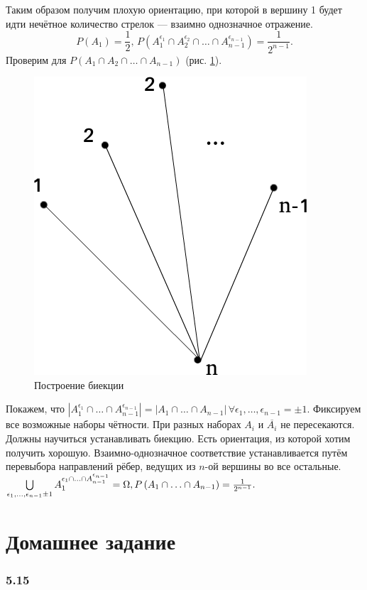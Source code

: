 Таким образом получим плохую ориентацию, при которой в вершину 1 будет идти нечётное количество стрелок --- взаимно однозначное отражение.
$$P \left( A_1 \right) =
\frac{1}{2}, \, P \left( A_1^{ \epsilon_1 } \cap A_2^{ \epsilon_2} \cap \dotsc \cap A_{n-1}^{ \epsilon_{n-1} } \right) =
\frac{1}{2^{n-1}}.$$
Проверим для $P \left( A_1 \cap A_2 \cap \dotsc \cap A_{n-1} \right) $ (рис. \ref{fig:5143}).

\begin{figure}[h!]
  \centering
  \includegraphics[width=.4\textwidth]{./pictures/5_14_3.png}
  \caption{Построение биекции}
  \label{fig:5143}
\end{figure}

Покажем, что
$ \left| A_1^{ \epsilon_1 } \cap \dotsc \cap A_{n-1}^{ \epsilon_{n-1} } \right| =
\left| A_1 \cap \dotsc \cap A_{n-1} \right| \,
\forall \epsilon_1, \dotsc, \epsilon_{n-1} =
\pm 1$.
Фиксируем все возможные наборы чётности.
При разных наборах $A_i$ и $ \overline{A_i} $ не пересекаются.
Должны научиться устанавливать биекцию.
Есть ориентация, из которой хотим получить хорошую.
Взаимно-однозначное соответствие устанавливается путём перевыбора направлений рёбер, ведущих из $n$-ой вершины во все остальные.
$ \bigcup \limits_{ \epsilon_1, \dotsc, \epsilon_{n-1} \pm 1} A_1^{ \epsilon_1 \cap \dotsc \cap A_{n-1}^{ \epsilon_{n-1} }} =
\Omega, \\
P \left( A_1 \cap \dotsc \cap A_{n-1} \right) =
\frac{1}{2^{n-1}}.$

\section*{Домашнее задание}

\subsubsection*{5.15}

